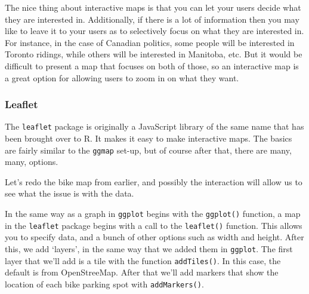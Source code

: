 \documentclass[
]{book}
\newenvironment{Shaded}{\begin{snugshade}}{\end{snugshade}}
\newcommand{\CommentTok}[1]{\textcolor[rgb]{0.56,0.35,0.01}{\textit{#1}}}
\newcommand{\DataTypeTok}[1]{\textcolor[rgb]{0.13,0.29,0.53}{#1}}
\newcommand{\KeywordTok}[1]{\textcolor[rgb]{0.13,0.29,0.53}{\textbf{#1}}}
\newcommand{\NormalTok}[1]{#1}
\newcommand{\OperatorTok}[1]{\textcolor[rgb]{0.81,0.36,0.00}{\textbf{#1}}}
\newcommand{\StringTok}[1]{\textcolor[rgb]{0.31,0.60,0.02}{#1}}
\begin{document}
The nice thing about interactive maps is that you can let your users decide what they are interested in. Additionally, if there is a lot of information then you may like to leave it to your users as to selectively focus on what they are interested in. For instance, in the case of Canadian politics, some people will be interested in Toronto ridings, while others will be interested in Manitoba, etc. But it would be difficult to present a map that focuses on both of those, so an interactive map is a great option for allowing users to zoom in on what they want.

\hypertarget{leaflet}{%
\subsubsection{Leaflet}\label{leaflet}}

The \texttt{leaflet} package is originally a JavaScript library of the same name that has been brought over to R. It makes it easy to make interactive maps. The basics are fairly similar to the \texttt{ggmap} set-up, but of course after that, there are many, many, options.

Let's redo the bike map from earlier, and possibly the interaction will allow us to see what the issue is with the data.

In the same way as a graph in \texttt{ggplot} begins with the \texttt{ggplot()} function, a map in the \texttt{leaflet} package begins with a call to the \texttt{leaflet()} function. This allows you to specify data, and a bunch of other options such as width and height. After this, we add `layers', in the same way that we added them in \texttt{ggplot}. The first layer that we'll add is a tile with the function \texttt{addTiles()}. In this case, the default is from OpenStreeMap. After that we'll add markers that show the location of each bike parking spot with \texttt{addMarkers()}.

\begin{Shaded}
\end{Shaded}
\end{document}
